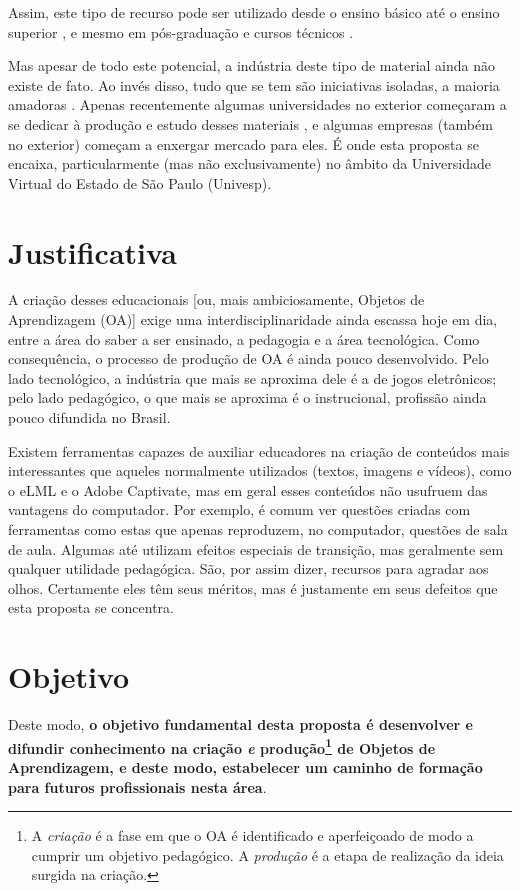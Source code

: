 Assim, este tipo de recurso pode ser utilizado desde o ensino básico \cite{coelho-sabido} até o ensino superior \cite{phet}, e mesmo em pós-graduação e cursos técnicos \cite{lock-in}.

Mas apesar de todo este potencial, a indústria deste tipo de material ainda não existe de fato. Ao invés disso, tudo que se tem são iniciativas isoladas, a maioria amadoras \cite{falstad, fendt}. Apenas recentemente algumas universidades no exterior começaram a se dedicar à produção e estudo desses materiais \cite{phet, merlot}, e algumas empresas (também no exterior) começam a enxergar mercado para eles. É onde esta proposta se encaixa, particularmente (mas não exclusivamente) no âmbito da Universidade Virtual do Estado de São Paulo (Univesp).

\section{Justificativa}

A criação desses  educacionais [ou, mais ambiciosamente, Objetos de Aprendizagem (OA)] exige uma interdisciplinaridade ainda escassa hoje em dia, entre a área do saber a ser ensinado, a pedagogia e a área tecnológica. Como consequência, o processo de produção de OA é ainda pouco desenvolvido. Pelo lado tecnológico, a indústria que mais se aproxima dele é a de jogos eletrônicos; pelo lado pedagógico, o que mais se aproxima é o  instrucional, profissão ainda pouco difundida no Brasil.

Existem ferramentas capazes de auxiliar educadores na criação de conteúdos mais interessantes que aqueles normalmente utilizados (textos, imagens e vídeos), como o eLML e o Adobe Captivate, mas em geral esses conteúdos não usufruem das vantagens do computador. Por exemplo, é comum ver questões criadas com ferramentas como estas que apenas reproduzem, no computador, questões de sala de aula. Algumas até utilizam efeitos especiais de transição, mas geralmente sem qualquer utilidade pedagógica. São, por assim dizer, recursos para agradar aos olhos. Certamente eles têm seus méritos, mas é justamente em seus defeitos que esta proposta se concentra.

\section{Objetivo}

Deste modo, {\bfseries o objetivo fundamental desta proposta é desenvolver e difundir conhecimento na criação \emph{e} produção\footnote{A \emph{criação} é a fase em que o OA é identificado e aperfeiçoado de modo a cumprir um objetivo pedagógico. A \emph{produção} é a etapa de realização da ideia surgida na criação.} de Objetos de Aprendizagem, e deste modo, estabelecer um caminho de formação para futuros profissionais nesta área}.

